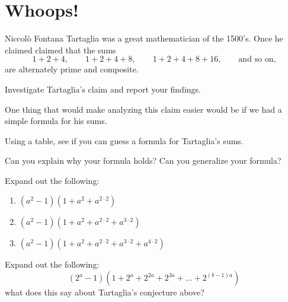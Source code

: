 \newpage
\activity\section{Whoops!}


Niccol\`{o} Fontana Tartaglia was a great mathematician of the
1500's. Once he claimed claimed that the sums
\[
1+2+4, \qquad 1+2+4+8, \qquad 1+2+4+8+16, \qquad\text{and so on,} 
\]
are alternately prime and composite.

\begin{prob}
Investigate Tartaglia's claim and report your findings.
\end{prob}

One thing that would make analyzing this claim easier would be if we
had a simple formula for his sums. 

\begin{prob} 
Using a table, see if you can guess a formula for Tartaglia's sums.
\end{prob}

\begin{prob} 
Can you explain why your formula holds? Can you generalize your
formula?
\end{prob}


\begin{prob}
Expand out the following:
\begin{enumerate}
\item $(a^2 -1)(1 + a^2 + a^{2 \cdot 2})$
\item $(a^2 -1)(1 + a^2 + a^{2 \cdot 2}+a^{3 \cdot 2})$  
\item $(a^2 -1)(1 + a^2 + a^{2 \cdot 2}+a^{3 \cdot 2} + a^{4 \cdot 2})$ 
\end{enumerate}
\end{prob}

\begin{prob} Expand out the following:
\[
(2^a - 1)(1 + 2^a + 2^{2a} + 2^{3a} + \dots + 2^{(b-1)a})
\]
what does this say about Tartaglia's conjecture above?
\end{prob}


